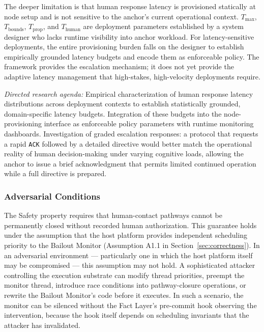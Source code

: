 The deeper limitation is that human response latency is provisioned statically
at node setup and is not sensitive to the anchor's current operational context.
$T_{\max}$, $T_{\text{bounds}}$, $T_{\text{prop}}$, and $T_{\text{human}}$ are
deployment parameters established by a system designer who lacks runtime
visibility into anchor workload.  For latency-sensitive deployments, the entire
provisioning burden falls on the designer to establish empirically grounded
latency budgets and encode them as enforceable policy.  The framework provides
the escalation mechanism; it does not yet provide the adaptive latency
management that high-stakes, high-velocity deployments require.

\textit{Directed research agenda:} Empirical characterization of human response
latency distributions across deployment contexts to establish statistically
grounded, domain-specific latency budgets.  Integration of these budgets into
the node-provisioning interface as enforceable policy parameters with runtime
monitoring dashboards.  Investigation of graded escalation responses: a protocol
that requests a rapid \texttt{ACK} followed by a detailed directive would better
match the operational reality of human decision-making under varying cognitive
loads, allowing the anchor to issue a brief acknowledgment that permits
limited continued operation while a full directive is prepared.

\subsubsection{Adversarial Conditions}\label{sec:adversarial-conditions}

The Safety property requires that human-contact pathways cannot be permanently
closed without recorded human authorization.  This guarantee holds under the
assumption that the host platform provides independent scheduling priority to
the Bailout Monitor (Assumption A1.1 in Section~\ref{sec:correctness}).  In an
adversarial environment --- particularly one in which the host platform itself
may be compromised --- this assumption may not hold.  A sophisticated attacker
controlling the execution substrate can modify thread priorities, preempt the
monitor thread, introduce race conditions into pathway-closure operations, or
rewrite the Bailout Monitor's code before it executes.  In such a scenario, the
monitor can be silenced without the Fact Layer's pre-commit hook observing the
intervention, because the hook itself depends on scheduling invariants that the
attacker has invalidated.

